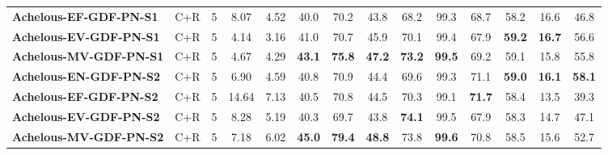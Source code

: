 \documentclass[letterpaper, 10 pt, conference]{ieeeconf}
\begin{document}
\begin{table*}
\begin{tabular}{l|cc|cc|ccc|cc|c|c|cc}
\textbf{Achelous-EF-GDF-PN-S1} & C+R & 5 & 8.07 & 4.52 & 40.0 & 70.2 & 43.8 & 68.2 & 99.3 & 68.7 & 58.2 & 16.6 & 46.8 \\
\textbf{Achelous-EV-GDF-PN-S1} & C+R & 5 & 4.14 & 3.16 & 41.0 & 70.7 & 45.9 & 70.1 & 99.4 & 67.9 & \textbf{59.2} & \textbf{16.7} & 56.6  \\
\textbf{Achelous-MV-GDF-PN-S1} & C+R & 5 & 4.67 & 4.29 & \textbf{43.1} & \textbf{75.8} & \textbf{47.2} & \textbf{73.2} & \textbf{99.5} & 69.2 & 59.1 & 15.8 & 55.8 \\
\midrule
\textbf{Achelous-EN-GDF-PN-S2} & C+R & 5 & 6.90 & 4.59 & 40.8 & 70.9 & 44.4 & 69.6 & 99.3 & 71.1 & \textbf{59.0} & \textbf{16.1} & \textbf{58.1} \\
\textbf{Achelous-EF-GDF-PN-S2} & C+R & 5 & 14.64 & 7.13 & 40.5 & 70.8 & 44.5 & 70.3 & 99.1 & \textbf{71.7} & 58.4 & 13.5 & 39.3  \\
\textbf{Achelous-EV-GDF-PN-S2} & C+R & 5 & 8.28 & 5.19 & 40.3 & 69.7 & 43.8 & \textbf{74.1} & 99.5 & 67.9 & 58.3 & 14.7 & 47.1 \\
\textbf{Achelous-MV-GDF-PN-S2} & C+R & 5 & 7.18 & 6.02 & \textbf{45.0} & \textbf{79.4} & \textbf{48.8} & 73.8 & \textbf{99.6} & 70.8 & 58.5 & 15.6 & 52.7 \\

\midrule


\end{tabular}
\end{table*}
\end{document}
